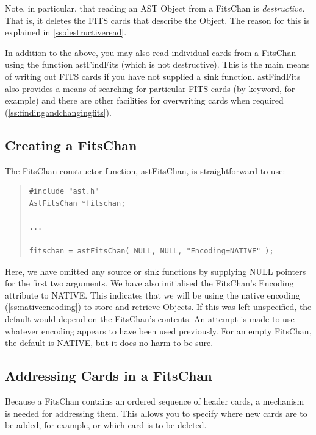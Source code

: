 \documentclass[twoside,11pt]{article}
\newcommand{\htmlref}[2]{#1}
\newcommand{\secref}[1]{\S\ref{#1}}
\renewcommand{\secref}[1]{\ref{#1}}
\begin{document}
Note, in particular, that reading an AST Object from a FitsChan is
{\em{destructive.}} That is, it deletes the FITS cards that describe the
Object. The reason for this is explained in
\secref{ss:destructiveread}.

In addition to the above, you may also read individual cards from a
FitsChan using the function \htmlref{astFindFits}{astFindFits} (which is not
destructive). This is the main means of writing out FITS cards if you
have not supplied a sink function.  astFindFits also provides a means
of searching for particular FITS cards (by keyword, for example) and
there are other facilities for overwriting cards when required
(\secref{ss:findingandchangingfits}).

\subsection{\label{ss:creatingafitschan}Creating a FitsChan}

The \htmlref{FitsChan}{FitsChan} constructor function, \htmlref{astFitsChan}{astFitsChan}, is straightforward to
use:

\begin{quote}
\small
\begin{verbatim}
#include "ast.h"
AstFitsChan *fitschan;

...

fitschan = astFitsChan( NULL, NULL, "Encoding=NATIVE" );
\end{verbatim}
\normalsize
\end{quote}

Here, we have omitted any source or sink functions by supplying NULL
pointers for the first two arguments.
We have also initialised the FitsChan's \htmlref{Encoding}{Encoding} attribute to
NATIVE. This indicates that we will be using the native encoding
(\secref{ss:nativeencoding}) to store and retrieve Objects. If this
was left unspecified, the default would depend on the FitsChan's
contents. An attempt is made to use whatever encoding appears to have
been used previously. For an empty FitsChan, the default is NATIVE,
but it does no harm to be sure.

\subsection{\label{ss:addressingfitscards}Addressing Cards in a FitsChan}

Because a \htmlref{FitsChan}{FitsChan} contains an ordered sequence of header cards, a
mechanism is needed for addressing them. This allows you to specify
where new cards are to be added, for example, or which card is to be
deleted.
\end{document}
